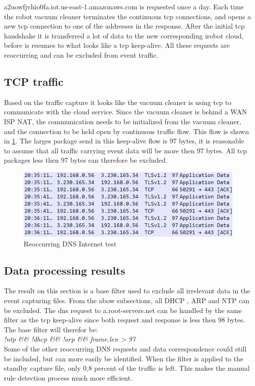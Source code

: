 a2uowfjvhio0fa.iot.us-east-1.amazonaws.com is requested once a day. Each time the robot vacuum cleaner terminates the continuous tcp connections, and opens a new tcp connection to one of the addresses in the response. After the initial tcp handshake it is transferred a lot of data to the new corresponding irobot cloud, before is resumes to what looks like a tcp keep-alive. All these requests are reoccurring and can be excluded from event traffic. 

\subsection{TCP traffic}
Based on the traffic capture it looks like the vacuum cleaner is using tcp to communicate with the cloud service. Since the vacuum cleaner is behind a WAN ISP NAT, the communication needs to be initialized from the vacuum cleaner, and the connection to be held open by continuous traffic flow. This flow is shown in \ref{fig:tcp_keep-alive}. The larges package send in this keep-alive flow is 97 bytes, it is reasonable to assume that all traffic carrying event data will be more then 97 bytes. All tcp packages less then 97 bytes can therefore be excluded. 

\begin{figure}[H]
    \centering
    \includegraphics[width=\textwidth]{figures/tcp_keep-alive.png}
    \caption{Reoccurring DNS Internet test}
    \label{fig:tcp_keep-alive}
\end{figure}

\subsection{Data processing results}
The result on this section is a base filter used to exclude all irrelevant data in the event capturing files. From the abow subsections, all DHCP , ARP and NTP can be excluded. The dns request to a.root-servers.net can be handled by the same filter as the tcp keep-alive since both request and response is less then 98 bytes. The base filter will therefor be:
\\
\textit{!ntp \&\& !dhcp \&\& !arp \&\& frame.len > 97}
\\
Some of the other reoccurring DNS requests and data correspondence could still be included, but can more easily be identified. When the filter is applied to the standby capture file, only 0,8 percent of the traffic is left. This makes the manual rule detection process much more efficient. 

